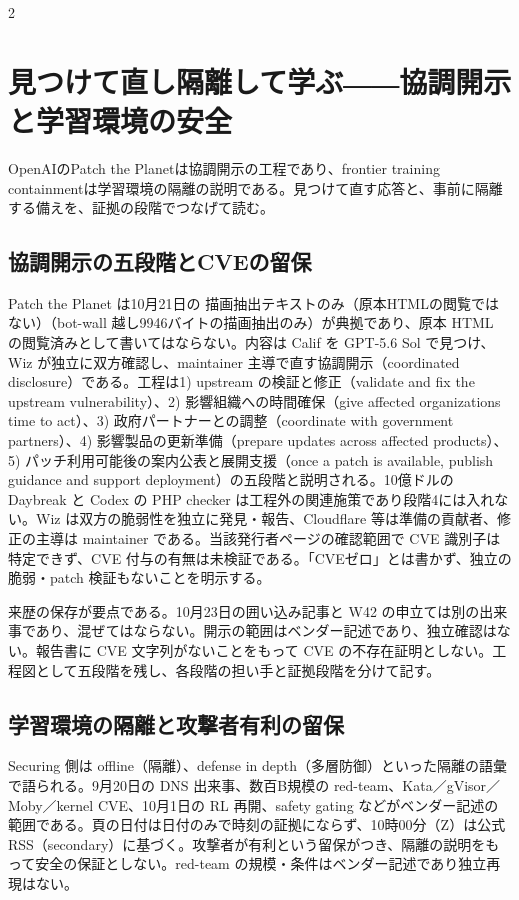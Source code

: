 \documentclass[lualatex,a4paper,10pt]{jlreq}
\begin{document}
\begin{multicols}{2} %


\section{見つけて直し隔離して学ぶ――協調開示と学習環境の安全}
\label{sec:P6}


OpenAIのPatch the Planetは協調開示の工程であり、frontier training containmentは学習環境の隔離の説明である。見つけて直す応答と、事前に隔離する備えを、証拠の段階でつなげて読む。


\subsection*{協調開示の五段階とCVEの留保}


Patch the Planet は10月21日の 描画抽出テキストのみ（原本HTMLの閲覧ではない）（bot-wall 越し9946バイトの描画抽出のみ）が典拠であり、原本 HTML の閲覧済みとして書いてはならない。内容は Calif を GPT-5.6 Sol で見つけ、Wiz が独立に双方確認し、maintainer 主導で直す協調開示（coordinated disclosure）である。工程は1) upstream の検証と修正（validate and fix the upstream vulnerability）、2) 影響組織への時間確保（give affected organizations time to act）、3) 政府パートナーとの調整（coordinate with government partners）、4) 影響製品の更新準備（prepare updates across affected products）、5) パッチ利用可能後の案内公表と展開支援（once a patch is available, publish guidance and support deployment）の五段階と説明される。10億ドルの Daybreak と Codex の PHP checker は工程外の関連施策であり段階4には入れない。Wiz は双方の脆弱性を独立に発見・報告、Cloudflare 等は準備の貢献者、修正の主導は maintainer である。当該発行者ページの確認範囲で CVE 識別子は特定できず、CVE 付与の有無は未検証である。「CVEゼロ」とは書かず、独立の脆弱・patch 検証もないことを明示する。


来歴の保存が要点である。10月23日の囲い込み記事と W42 の申立ては別の出来事であり、混ぜてはならない。開示の範囲はベンダー記述であり、独立確認はない。報告書に CVE 文字列がないことをもって CVE の不存在証明としない。工程図として五段階を残し、各段階の担い手と証拠段階を分けて記す。


\subsection*{学習環境の隔離と攻撃者有利の留保}


Securing 側は offline（隔離）、defense in depth（多層防御）といった隔離の語彙で語られる。9月20日の DNS 出来事、数百B規模の red-team、Kata／gVisor／Moby／kernel CVE、10月1日の RL 再開、safety gating などがベンダー記述の範囲である。頁の日付は日付のみで時刻の証拠にならず、10時00分（Z）は公式 RSS（secondary）に基づく。攻撃者が有利という留保がつき、隔離の説明をもって安全の保証としない。red-team の規模・条件はベンダー記述であり独立再現はない。



\end{multicols}
\end{document}
